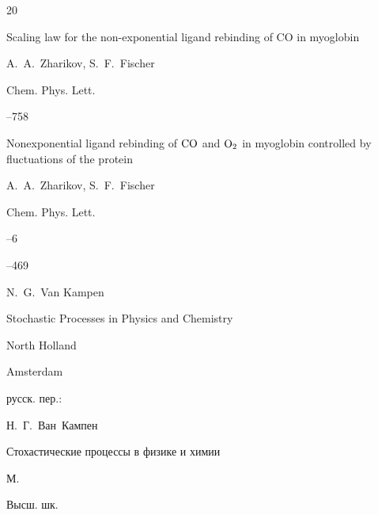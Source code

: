 {\begin{thebibliography}{20}

\paper Scaling law for the non-exponential ligand rebinding of CO in myoglobin

\by A.~A.~Zharikov, S.~F.~Fischer

\jour Chem. Phys. Lett.




--758











\paper Nonexponential ligand rebinding of $\rm CO$ and $\rm O_2$ in myoglobin controlled by fluctuations of the protein

\by A.~A.~Zharikov, S.~F.~Fischer

\jour Chem. Phys. Lett.



--6

--469











\by N.~G.~Van Kampen  


\book Stochastic Processes in Physics and Chemistry

\publ North Holland

\publaddr Amsterdam

\rtransl русск. пер.:~

\by Н.~Г.~Ван~Кампен

\book Стохастические процессы в физике и химии

\publaddr М.

\publ Высш. шк.










\end{thebibliography}}

